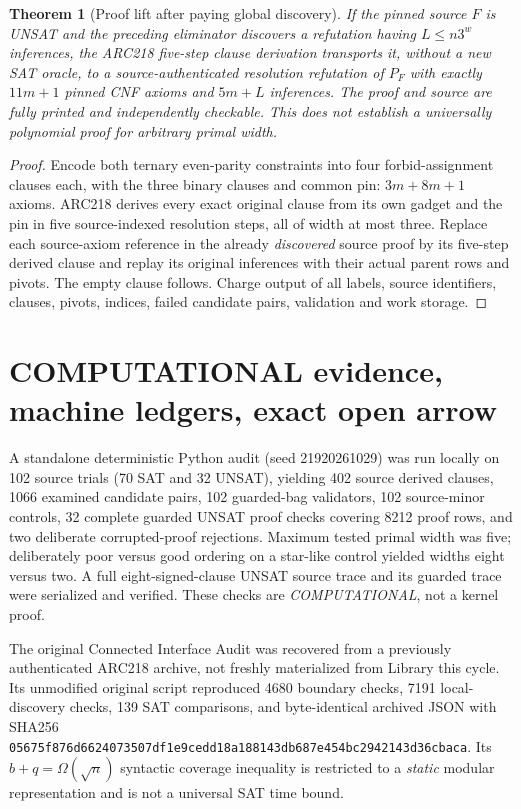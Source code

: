 \documentclass[11pt]{article}
\newtheorem{theorem}{Theorem}
\begin{document}
\begin{theorem}[Proof lift after paying global discovery]
If the pinned source $F$ is UNSAT and the preceding eliminator discovers a refutation having $L\le n3^w$ inferences, the ARC218 five-step clause derivation transports it, without a new SAT oracle, to a source-authenticated resolution refutation of $P_F$ with exactly $11m+1$ pinned CNF axioms and $5m+L$ inferences. The proof and source are fully printed and independently checkable. This does \emph{not} establish a universally polynomial proof for arbitrary primal width.
\end{theorem}
\begin{proof}
Encode both ternary even-parity constraints into four forbid-assignment clauses each, with the three binary clauses and common pin: $3m+8m+1$ axioms. ARC218 derives every exact original clause from its own gadget and the pin in five source-indexed resolution steps, all of width at most three. Replace each source-axiom reference in the already \emph{discovered} source proof by its five-step derived clause and replay its original inferences with their actual parent rows and pivots. The empty clause follows. Charge output of all labels, source identifiers, clauses, pivots, indices, failed candidate pairs, validation and work storage.
\end{proof}

\section{COMPUTATIONAL evidence, machine ledgers, exact open arrow}
A standalone deterministic Python audit (seed 21920261029) was run locally on 102 source trials (70 SAT and 32 UNSAT), yielding 402 source derived clauses, 1066 examined candidate pairs, 102 guarded-bag validators, 102 source-minor controls, 32 complete guarded UNSAT proof checks covering 8212 proof rows, and two deliberate corrupted-proof rejections. Maximum tested primal width was five; deliberately poor versus good ordering on a star-like control yielded widths eight versus two. A full eight-signed-clause UNSAT source trace and its guarded trace were serialized and verified. These checks are \emph{COMPUTATIONAL}, not a kernel proof.

The original Connected Interface Audit was recovered from a previously authenticated ARC218 archive, not freshly materialized from Library this cycle. Its unmodified original script reproduced 4680 boundary checks, 7191 local-discovery checks, 139 SAT comparisons, and byte-identical archived JSON with SHA256 \texttt{05675f876d6624073507df1e9cedd18a188143db687e454bc2942143d36cbaca}. Its $b+q=\Omega(\sqrt n)$ syntactic coverage inequality is restricted to a \emph{static} modular representation and is not a universal SAT time bound.
\end{document}

